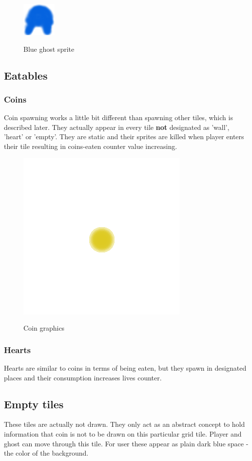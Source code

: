 \documentclass[11pt,a4paper]{report}
\newcommand{\dsubsection}[1]{\FloatBarrier \subsection{#1}}
\newenvironment{img}{
	\begin{center}
		\begin{figure}[H]
			\begin{center}
			
}{
	\end{center}
		\end{figure}
			\end{center}
}
\begin{document}
				 \begin{img}
				 	\includegraphics{images/blueghost}\\
				 	\caption{Blue ghost sprite}
				 \end{img}
			\dsubsection{Eatables}
				\subsubsection{Coins}
					\label{coins}
					Coin spawning works a little bit different than spawning other tiles, which is described later. They actually appear in every tile \textbf{not} designated as 'wall', 'heart' or 'empty'. They are static and their sprites are killed when player enters their tile resulting in coins-eaten counter value increasing.
					\begin{img}
						\includegraphics{images/coin}\\
						\caption{Coin graphics}
					\end{img}
				\subsubsection{Hearts}
					\label{hearts}
					Hearts are similar to coins in terms of being eaten, but they spawn in designated places and their consumption increases lives counter.
			\dsubsection{Empty tiles}
				These tiles are actually not drawn. They only act as an abstract concept to hold information that coin is not to be drawn on this particular grid tile. Player and ghost can move through this tile. For user these appear as plain dark blue space - the color of the background.
\end{document}
